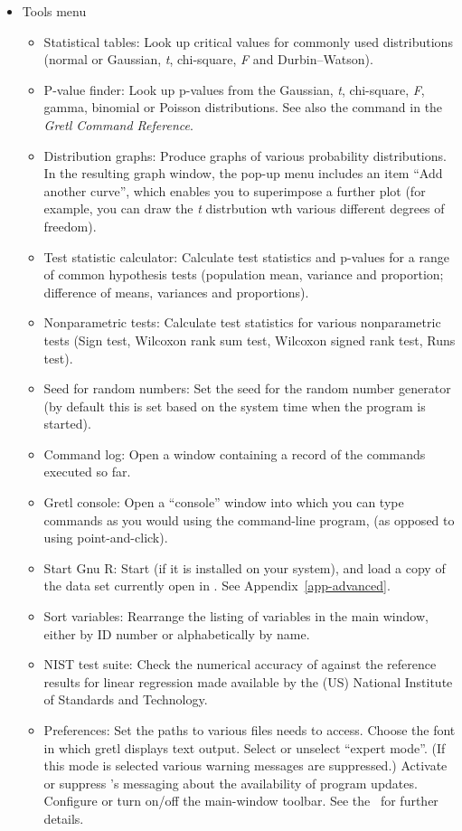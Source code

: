 \begin{itemize}
\item \textsf{Tools menu}
  \begin{itemize}
  \item \textsf{Statistical tables}: Look up critical values for
    commonly used distributions (normal or Gaussian, \emph{t},
    chi-square, \emph{F} and Durbin--Watson).
  \item \textsf{P-value finder}: Look up p-values from the Gaussian,
    \emph{t}, chi-square, \emph{F}, gamma, binomial or Poisson
    distributions. See also the  command in the
    \emph{Gretl Command Reference}.
  \item \textsf{Distribution graphs}: Produce graphs of various
    probability distributions.  In the resulting graph window,
    the pop-up menu includes an item ``Add another curve'', which
    enables you to superimpose a further plot (for example, you
    can draw the \emph{t} distrbution wth various different degrees
    of freedom).
  \item \textsf{Test statistic calculator}: Calculate test statistics
    and p-values for a range of common hypothesis tests (population
    mean, variance and proportion; difference of means, variances and
    proportions).  
  \item \textsf{Nonparametric tests}: Calculate test statistics
    for various nonparametric tests (Sign test, Wilcoxon rank sum
    test, Wilcoxon signed rank test, Runs test).
  \item \textsf{Seed for random numbers}: Set the seed for the random
    number generator (by default this is set based on the system time
    when the program is started).
  \item \textsf{Command log}: Open a window containing a record
    of the commands executed so far.
  \item \textsf{Gretl console}: Open a ``console'' window into which
    you can type commands as you would using the command-line program,
     (as opposed to using point-and-click).
  \item \textsf{Start Gnu R}: Start  (if it is installed on
    your system), and load a copy of the data set currently open in
    .  See Appendix~\ref{app-advanced}.
  \item \textsf{Sort variables}: Rearrange the listing of variables in
    the main window, either by ID number or alphabetically by name.
  \item \textsf{NIST test suite}: Check the numerical accuracy of
     against the reference results for linear regression
    made available by the (US) National Institute of Standards and
    Technology.
  \item \textsf{Preferences}: Set the paths to various files
     needs to access. Choose the font in which gretl
    displays text output.  Select or unselect ``expert mode''. (If
    this mode is selected various warning messages are suppressed.)
    Activate or suppress 's messaging about the
    availability of program updates.  Configure or turn on/off the
    main-window toolbar. See the \GCR\ for
    further details.
  \end{itemize}


\end{itemize}
